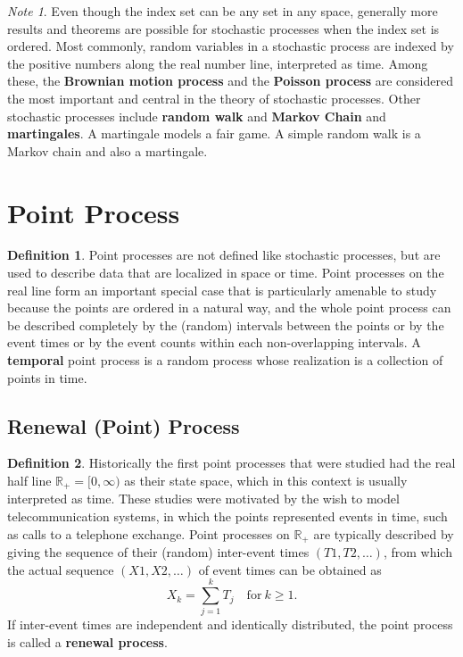 \documentclass[12pt]{article}
\theoremstyle{plain}
\theoremstyle{definition}
\newtheorem{definition}{Definition}
\theoremstyle{remark}
\newtheorem*{note}{Note}
\begin{document}
\begin{note}
  Even though the index set can be any set in any space, generally more results
  and theorems are possible  for stochastic processes when the index set is
  ordered.
  Most commonly, random variables in a stochastic process are indexed by the
  positive numbers along the real number line, interpreted as time.
  Among these, the \textbf{Brownian motion process} and
  the \textbf{Poisson process} are considered the most important and central in
  the theory of stochastic processes.
  Other stochastic processes include \textbf{random walk} and
  \textbf{Markov Chain} and \textbf{martingales}.
  A martingale models a fair game.
  A simple random walk is a Markov chain and also a martingale.
\end{note}

\section{Point Process}

\begin{definition}
  Point processes are not defined like stochastic processes, but are used to
  describe data that are localized in space or time.
  Point processes on the real line form an important special case that is
  particularly amenable to study because the points are ordered in a natural
  way, and the whole point process can be described completely by the (random)
  intervals between the points or by the event times or by the event counts
  within each non-overlapping intervals.
  A \textbf{temporal} point process is a random process whose realization is a
  collection of points in time.
\end{definition}

\subsection{Renewal (Point) Process}

\begin{definition}
  Historically the first point processes that were studied had the real half
  line $\mathbb{R}_+ = [0,\infty)$ as their state space, which in this context
  is usually interpreted as time.
  These studies were motivated by the wish to model telecommunication systems,
  in which the points represented events in time, such as calls to a telephone
  exchange.
  Point processes on $\mathbb{R}_+$ are typically described by giving the
  sequence of their (random) inter-event times $(T1,T2,\dots)$, from which the
  actual sequence $(X1,X2,\dots)$ of event times can be obtained as
  \begin{equation*}
    X_k = \sum_{j=1}^{k} T_j\quad \text{for}\ k \geq 1.
  \end{equation*}
  If inter-event times are independent and identically distributed, the point
  process is called a \textbf{renewal process}.
\end{definition}
\end{document}

